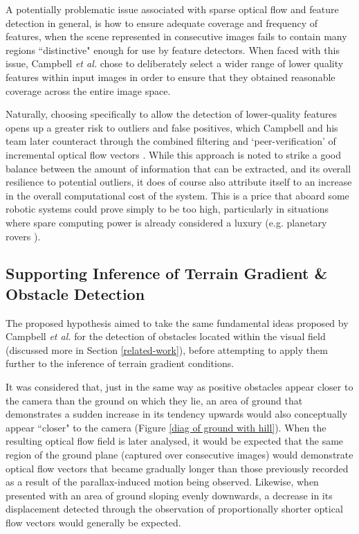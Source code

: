 A potentially problematic issue associated with sparse optical flow and feature detection in general, is how to ensure adequate coverage and frequency of features, when the scene represented in consecutive images fails to contain many regions ``distinctive" enough for use by feature detectors. When faced with this issue, Campbell \textit{et al.} \cite{campbell} chose to deliberately select a wider range of lower quality features within input images in order to ensure that they obtained reasonable coverage across the entire image space. 

Naturally, choosing specifically to allow the detection of lower-quality features opens up a greater risk to outliers and false positives, which Campbell and his team later counteract through the combined filtering and `peer-verification' of incremental optical flow vectors \cite{campbell}. While this approach is noted to strike a good balance between the amount of information that can be extracted, and its overall resilience to potential outliers, it does of course also attribute itself to an increase in the overall computational cost of the system. This is a price that aboard some robotic systems could prove simply to be too high, particularly in situations where spare computing power is already considered a luxury (e.g. planetary rovers \cite{mer}). 

\subsection{Supporting Inference of Terrain Gradient \& Obstacle Detection}
\label{hypo-gradient}

The proposed hypothesis aimed to take the same fundamental ideas proposed by Campbell \textit{et al.} \cite{campbell} for the detection of obstacles located within the visual field (discussed more in Section \ref{related-work}), before attempting to apply them further to the inference of terrain gradient conditions. 

It was considered that, just in the same way as positive obstacles appear closer to the camera than the ground on which they lie, an area of ground that demonstrates a sudden increase in its tendency upwards would also conceptually appear ``closer" to the camera (Figure \ref{diag of ground with hill}). When the resulting optical flow field is later analysed, it would be expected that the same region of the ground plane (captured over consecutive images) would demonstrate optical flow vectors that became gradually longer than those previously recorded as a result of the parallax-induced motion being observed. Likewise, when presented with an area of ground sloping evenly downwards, a decrease in its displacement detected through the observation of proportionally shorter optical flow vectors would generally be expected.  

